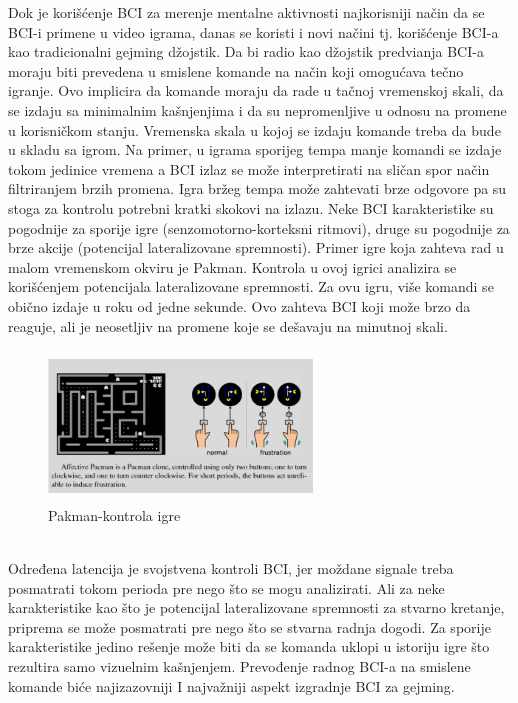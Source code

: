 \documentclass[conference]{IEEEtran}
\begin{document}
Dok je korišćenje BCI za merenje mentalne aktivnosti najkorisniji način da se BCI-i primene u video igrama, danas se koristi i novi načini tj. korišćenje BCI-a kao tradicionalni gejming džojstik. Da bi radio kao džojstik predvi\dj anja BCI-a moraju biti prevedena u smislene komande na način koji omogućava tečno igranje. Ovo implicira da komande moraju da rade u tačnoj vremenskoj skali, da se izdaju sa minimalnim kašnjenjima i da su nepromenljive u odnosu na promene u korisničkom stanju. Vremenska skala u kojoj se izdaju komande treba da bude u skladu sa igrom. Na primer, u igrama sporijeg tempa manje komandi se izdaje tokom jedinice vremena a BCI izlaz se može interpretirati na sličan spor način filtriranjem brzih promena. Igra bržeg tempa može zahtevati brze odgovore pa su stoga za kontrolu potrebni kratki skokovi na izlazu. Neke BCI karakteristike su pogodnije za sporije igre (senzomotorno-korteksni ritmovi), druge su pogodnije za brze akcije (potencijal lateralizovane spremnosti). Primer igre koja zahteva rad u malom vremenskom okviru je Pakman. Kontrola u ovoj igrici analizira se korišćenjem potencijala lateralizovane spremnosti. Za ovu igru, više komandi se obično izdaje u roku od jedne sekunde. Ovo zahteva BCI koji može brzo da reaguje, ali je neosetljiv na promene koje se dešavaju na minutnoj skali.\\
\begin{figure}[htp]
\centerline{\includegraphics[width=7cm, height=4cm]{pacman.png}}
\caption{Pakman-kontrola igre}
\label{Slika}
\end{figure}\\
Određena latencija je svojstvena kontroli BCI, jer moždane signale treba posmatrati tokom perioda pre nego što se mogu analizirati. Ali za neke karakteristike kao što je potencijal lateralizovane spremnosti za stvarno kretanje, priprema se može posmatrati pre nego što se stvarna radnja dogodi.  Za sporije karakteristike jedino rešenje može biti da se komanda uklopi u istoriju igre što rezultira samo vizuelnim kašnjenjem. Prevođenje radnog BCI-a na smislene komande biće najizazovniji I najvažniji aspekt izgradnje BCI za gejming. \\
\end{document}
